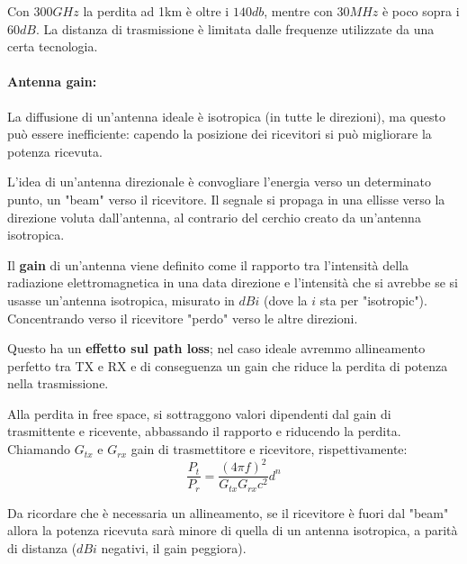 Con $300GHz$ la perdita ad 1km è oltre i $140db$, mentre con $30MHz$ è poco sopra i $60dB$. La distanza di trasmissione è limitata dalle frequenze utilizzate da una certa tecnologia.

\paragraph{Antenna gain:} La diffusione di un'antenna ideale è isotropica (in tutte le direzioni), ma questo può essere inefficiente: capendo la posizione dei ricevitori si può migliorare la potenza ricevuta. 

L'idea di un'antenna direzionale è convogliare l'energia verso un determinato punto, un "beam" verso il ricevitore. Il segnale si propaga in una ellisse verso la direzione voluta dall'antenna, al contrario del cerchio creato da un'antenna isotropica.

Il \textbf{gain} di un'antenna viene definito come il rapporto tra l'intensità della radiazione elettromagnetica in una data direzione e l'intensità che si avrebbe se si usasse un'antenna isotropica, misurato in $dBi$ (dove la $i$ sta per "isotropic"). Concentrando verso il ricevitore "perdo" verso le altre direzioni. 

Questo ha un \textbf{effetto sul path loss}; nel caso ideale avremmo allineamento perfetto tra TX e RX e di conseguenza un gain che riduce la perdita di potenza nella trasmissione. 

Alla perdita in free space, si sottraggono valori dipendenti dal gain di trasmittente e ricevente, abbassando il rapporto e riducendo la perdita. Chiamando $G_{tx}$ e $G_{rx}$ gain di trasmettitore e ricevitore, rispettivamente: 
$$ \frac{P_t}{P_r} = \frac{(4 \pi f)^2}{G_{tx} G_{rx} c^2} d^n $$

Da ricordare che è necessaria un allineamento, se il ricevitore è fuori dal "beam" allora la potenza ricevuta sarà minore di quella di un antenna isotropica, a parità di distanza ($dBi$ negativi, il gain peggiora).

